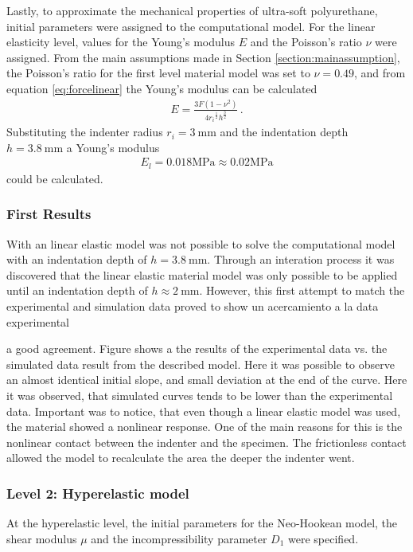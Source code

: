 Lastly, to approximate the mechanical properties of ultra-soft polyurethane, initial parameters were assigned 
to the computational model. For the linear elasticity level, values for the Young's modulus $E$ and the 
Poisson's ratio $\nu$ were assigned. From the main assumptions made in Section \ref{section:mainassumption},
the Poisson's ratio for the first level material model was set to $\nu =  0.49$, and from equation \ref{eq:forcelinear} the Young's
modulus can be calculated 
\begin{align}
    E = \frac{3F(1-\nu^2)} {4{r_i}^{\frac{1}{2}} {h}^{\frac{3}{2}}}\, .
    \label{eq:forcelinearcp1}
\end{align}
Substituting the indenter radius $r_i =  \SI{3}{\milli \meter}$ and the indentation depth $h =  \SI{3.8}{\milli \meter}$ a Young's modulus 
\begin{align}
    E_l = 0.018 \text{MPa} \approx 0.02 \text{MPa}
    \label{eq:Elinearcp1}
\end{align}
could be calculated. 

\subsubsection*{First Results}
With an linear elastic model was not possible to solve the computational model with an indentation depth of $h = \SI{3.8}{\milli \meter}$.
Through an interation process it was discovered that the linear elastic material model was only possible to be applied until an indentation 
depth of $h \approx \SI{2}{\milli \meter}$. However, this first attempt to match the experimental and simulation data proved 
to show un acercamiento a la data experimental 

a good agreement. Figure %
shows a the results of the experimental data vs. the simulated data result from the described model. Here it was possible to 
observe an almost identical initial slope, and small deviation at the end of the curve. Here it was observed, that simulated 
curves tends to be lower than the experimental data. 
Important was to notice, that even though a linear elastic model was used, the material showed a nonlinear response. One of the main 
reasons for this is the nonlinear contact between the indenter and the specimen. The frictionless contact allowed the model 
to recalculate the area the deeper the indenter went. 



\subsubsection*{Level 2: Hyperelastic model}
At the hyperelastic level, the initial parameters for the Neo-Hookean model, 
the shear modulus $\mu$ and the incompressibility parameter $D_1$ were specified.\\ 

